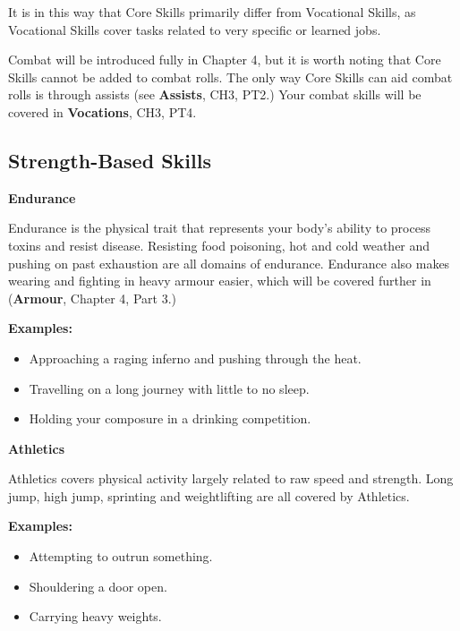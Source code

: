 It is in this way that Core Skills primarily differ from Vocational Skills, as Vocational Skills cover tasks related to very specific or learned jobs.

Combat will be introduced fully in Chapter 4, but it is worth noting that Core Skills cannot be added to combat rolls. The only way Core Skills can aid combat rolls is through assists (see \textbf{Assists}, CH3, PT2.) Your combat skills will be covered in \textbf{Vocations}, CH3, PT4. %

\subsection{Strength-Based Skills} \label{sec:strength_based_skills}

\textbf{Endurance}

Endurance is the physical trait that represents your body’s ability to process toxins and resist disease. Resisting food poisoning, hot and cold weather and pushing on past exhaustion are all domains of endurance. Endurance also makes wearing and fighting in heavy armour easier, which will be covered further in (\textbf{Armour}, Chapter 4, Part 3.) %

\begin{displayquote}
    \textbf{Examples:}
    \begin{itemize}
        \item Approaching a raging inferno and pushing through the heat.
        \item Travelling on a long journey with little to no sleep.
        \item Holding your composure in a drinking competition.
    \end{itemize}
\end{displayquote}

\textbf{Athletics}

Athletics covers physical activity largely related to raw speed and strength. Long jump, high jump, sprinting and weightlifting are all covered by Athletics.

\begin{displayquote}
    \textbf{Examples:}
    \begin{itemize}
        \item Attempting to outrun something.
        \item Shouldering a door open.
        \item Carrying heavy weights.
    \end{itemize}
\end{displayquote}

